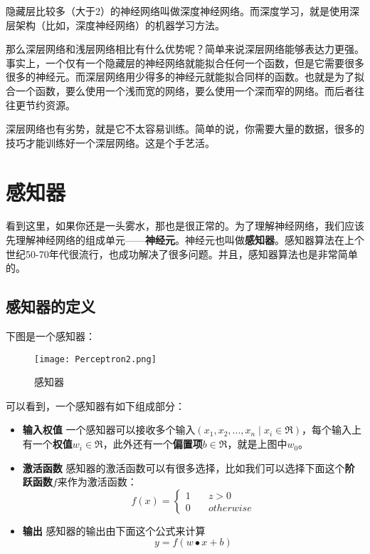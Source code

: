 隐藏层比较多（大于2）的神经网络叫做深度神经网络。而深度学习，就是使用深层架构（比如，深度神经网络）的机器学习方法。

那么深层网络和浅层网络相比有什么优势呢？简单来说深层网络能够表达力更强。事实上，一个仅有一个隐藏层的神经网络就能拟合任何一个函数，但是它需要很多很多的神经元。而深层网络用少得多的神经元就能拟合同样的函数。也就是为了拟合一个函数，要么使用一个浅而宽的网络，要么使用一个深而窄的网络。而后者往往更节约资源。

深层网络也有劣势，就是它不太容易训练。简单的说，你需要大量的数据，很多的技巧才能训练好一个深层网络。这是个手艺活。


\section{感知器}\label{Per:2}
看到这里，如果你还是一头雾水，那也是很正常的。为了理解神经网络，我们应该先理解神经网络的组成单元------\textbf{神经元}。神经元也叫做\textbf{感知器}。感知器算法在上个世纪50-70年代很流行，也成功解决了很多问题。并且，感知器算法也是非常简单的。

\subsection{感知器的定义}\label{Per:3}

下图是一个感知器：

\begin{figure}[htbp]
	\centering
	\texttt{[image: Perceptron2.png]}
	\caption{感知器}
\end{figure}

可以看到，一个感知器有如下组成部分：

\begin{itemize}
	\item
	      \textbf{输入权值}
	      一个感知器可以接收多个输入$(x_1, x_2,...,x_n\mid x_i\in\Re)$，每个输入上有一个\textbf{权值}$w_i\in\Re$，此外还有一个\textbf{偏置项}$b\in\Re$，就是上图中$w_0$。
	\item
	      \textbf{激活函数}
	      感知器的激活函数可以有很多选择，比如我们可以选择下面这个\textbf{阶跃函数}$f$来作为激活函数：
	      \begin{equation*}
		      f(x)=\left\{
		      \begin{aligned}
			      1 & \quad z>0       \\
			      0 & \quad otherwise
		      \end{aligned}
		      \right.
	      \end{equation*}
	\item
	      \textbf{输出} 感知器的输出由下面这个公式来计算
	      \begin{equation}
		      \label{eq:Per1}
		      y=f(w \bullet x + b)
	      \end{equation}
\end{itemize}

